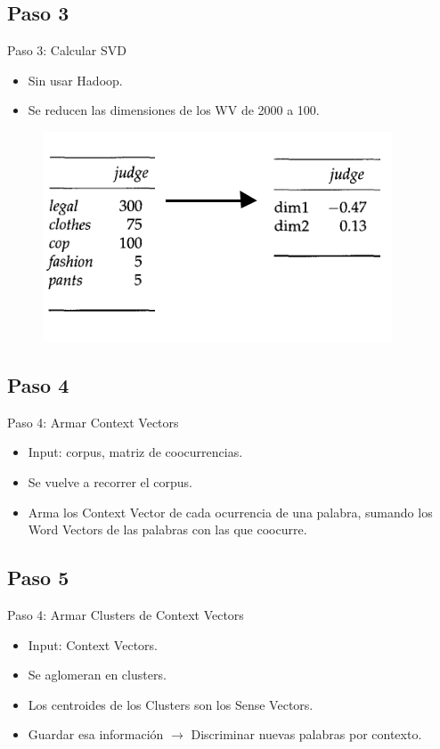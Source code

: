 \documentclass[xcolor=x11names,compress]{beamer}
\renewcommand{\(}{\begin{columns}}
\renewcommand{\)}{\end{columns}}
\newcommand{\<}[1]{\begin{column}{#1}}
\renewcommand{\>}{\end{column}}
\begin{document}
\subsection{Paso 3}
\begin{frame}{Paso 3: Calcular SVD}
\begin{itemize}
\item Sin usar Hadoop.
\item Se reducen las dimensiones de los WV de 2000 a 100.
\end{itemize}
\begin{figure}
\centering
\includegraphics[scale=0.4, keepaspectratio=True, natwidth=800,natheight=600]{svd.png}
\end{figure}
\end{frame}


\subsection{Paso 4}
\begin{frame}{Paso 4: Armar Context Vectors}
\begin{itemize}
\item Input: corpus, matriz de coocurrencias.
\item Se vuelve a recorrer el corpus.
\item Arma los Context Vector de cada ocurrencia de una palabra, sumando los Word Vectors de las palabras con las que coocurre.
\end{itemize}
\end{frame}


\subsection{Paso 5}
\begin{frame}{Paso 4: Armar Clusters de Context Vectors}
\begin{itemize}
\item Input: Context Vectors.
\item Se aglomeran en clusters.
\item Los centroides de los Clusters son los Sense Vectors.
\item Guardar esa información $\rightarrow$ Discriminar nuevas palabras por contexto.
\end{itemize}
\end{frame}
\end{document}
